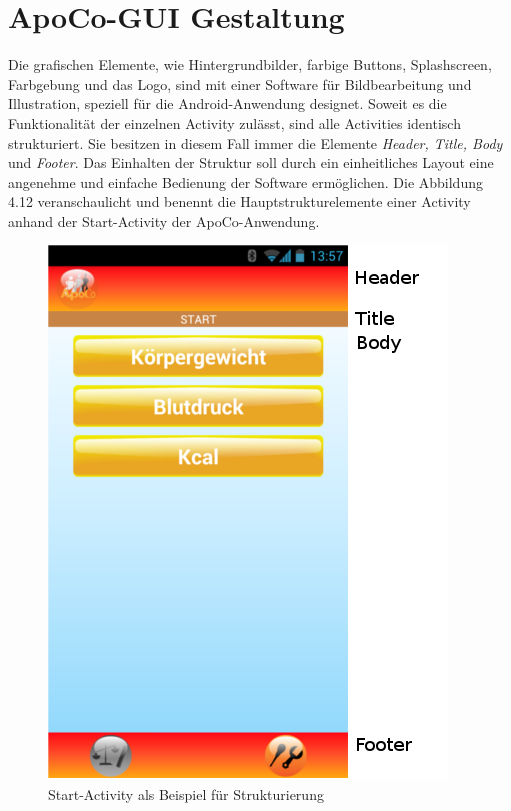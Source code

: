 

\section{ApoCo-GUI Gestaltung}

Die grafischen Elemente, wie Hintergrundbilder, farbige Buttons, Splashscreen, Farbgebung und das Logo,
sind mit einer Software f\"ur Bildbearbeitung und Illustration,
speziell f\"ur die Android-Anwendung designet.
Soweit es die Funktionalit\"at der einzelnen Activity zul\"asst, sind alle Activities identisch strukturiert.
Sie besitzen in diesem Fall immer die Elemente \emph{Header, Title, Body} und \emph{Footer}.
Das Einhalten der Struktur soll durch ein einheitliches Layout eine angenehme und einfache Bedienung der Software erm\"oglichen.
Die Abbildung 4.12 veranschaulicht und benennt die Hauptstrukturelemente einer Activity anhand der Start-Activity der ApoCo-Anwendung.\\

\begin{figure}[h]
  \centering
  \includegraphics[scale=0.5]{screenshots/kapitel4/gui/activity_struktur.png}
  \caption{Start-Activity als Beispiel f\"ur Strukturierung}
  
\end{figure}

